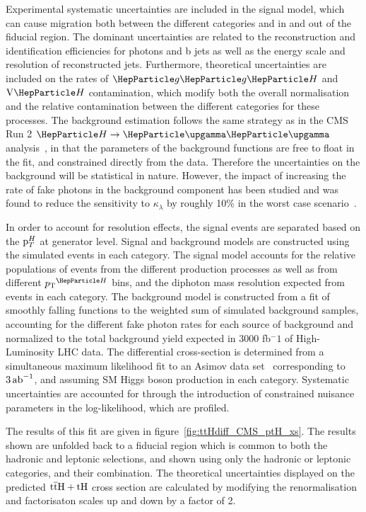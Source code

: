 Experimental systematic uncertainties are included in the signal model, which can cause migration both between the different categories and in and out of the fiducial region. The dominant uncertainties are related to the reconstruction and identification efficiencies for photons and b jets as well as the energy scale and resolution of reconstructed jets. 
Furthermore, theoretical uncertainties are included on the rates of $\ggh$ and $\vh$ contamination, which modify both the overall normalisation and the relative contamination between the different categories for these processes. The background estimation follows the same strategy as in the CMS Run 2 $\hgg$ analysis~\cite{Sirunyan:2018ouh}, in that the parameters of the background functions are free to float in the fit, and constrained directly from the data. Therefore the uncertainties on the background will be statistical in nature.
However, the impact of increasing the rate of fake photons in the background component has been studied and was found to reduce the sensitivity to $\kappa_\lambda$ by roughly 10\% in the worst case scenario~\cite{CMS-PAS-FTR-18-020}.  


In order to account for resolution effects, the signal events are separated based on the $\mathrm{p}_{T}^H$ at generator level.   Signal and background models are constructed using the simulated events in each category. The signal model accounts for the relative populations of events from the different production processes as well as from different $\pTH$ bins, and the diphoton mass resolution expected from events in each category. The background model is constructed from a fit of smoothly falling functions to the weighted sum of simulated background samples, accounting for the different fake photon rates for each source of background and normalized to the  total background yield expected in 3000 fb$^-1$ of High-Luminosity LHC data. The differential cross-section is determined from a simultaneous maximum likelihood fit to an Asimov data set~\cite{Cowan:2010js} corresponding to $3\mbox{\ensuremath{\,\text{ab}^\text{$-$1}}}$, and assuming SM Higgs boson  production in each category.  Systematic uncertainties are accounted for through the introduction of constrained nuisance parameters in the log-likelihood, which are profiled. 

The results of this fit are given in figure~\ref{fig:ttHdiff_CMS_ptH_xs}. The results shown are unfolded back to a fiducial region which is common to both the hadronic and leptonic selections, and shown using only the hadronic or leptonic categories, and their combination. The theoretical uncertainties displayed on the predicted $\text{t}\overline{\text{t}}\text{H}+\text{tH}$ cross section are calculated by modifying the renormalisation and factorisaton scales up and down by a factor of 2.

